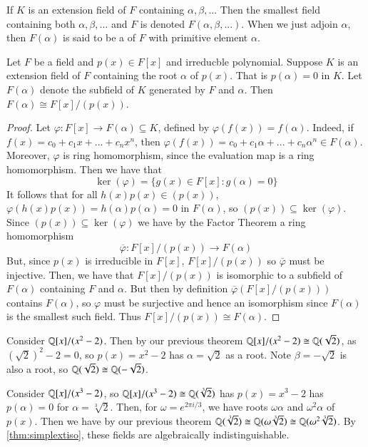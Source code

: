 \begin{definition}
    If $K$ is an extension field of $F$ containing $\alpha, \beta,...$ Then the smallest field containing both $\alpha,\beta,...$ and $F$ is denoted $F(\alpha,\beta,...)$. When we just adjoin $\alpha$, then $F(\alpha)$ is said to be a  of $F$ with primitive element $\alpha$.
\end{definition}


\begin{theorem}\label{thm:simplextiso}
    Let $F$ be a field and $p(x) \in F[x]$ and irreducble polynomial. Suppose $K$ is an extension field of $F$ containing the root $\alpha$ of $p(x)$. That is $p(\alpha) = 0$ in $K$. Let $F(\alpha)$ denote the subfield of $K$ generated by $F$ and $\alpha$. Then $F(\alpha) \cong F[x]/(p(x))$.
\end{theorem}
\begin{proof}
    Let $\varphi:F[x]\rightarrow F(\alpha) \subseteq K$, defined by $\varphi(f(x)) = f(\alpha)$. Indeed, if $f(x) = c_0+c_1x+...+c_nx^n$, then $\varphi(f(x)) = c_0+c_1\alpha+...+c_n\alpha^n \in F(\alpha)$. Moreover, $\varphi$ is ring homomorphism, since the evaluation map is a ring homomorphism. Then we have that $$\ker(\varphi) = \{g(x) \in F[x]:g(\alpha) = 0\}$$
    It follows that for all $h(x)p(x) \in (p(x))$, $\varphi(h(x)p(x)) = h(\alpha)p(\alpha) = 0$ in $F(\alpha)$, so $(p(x)) \subseteq \ker(\varphi)$. Since $(p(x)) \subseteq \ker(\varphi)$ we have by the Factor Theorem a ring homomorphism $$\overline{\varphi}:F[x]/(p(x)) \rightarrow F(\alpha)$$
    But, since $p(x)$ is irreducible in $F[x]$, $F[x]/(p(x))$ so $\overline{\varphi}$ must be injective. Then, we have that $F[x]/(p(x))$ is isomorphic to a subfield of $F(\alpha)$ containing $F$ and $\alpha$. But then by definition $\overline{\varphi}(F[x]/(p(x)))$ contains $F(\alpha)$, so $\varphi$ must be surjective and hence an isomorphism since $F(\alpha)$ is the smallest such field. Thus $F[x]/(p(x)) \cong F(\alpha)$.
\end{proof}


\begin{example}
    Consider $\mathbb Q[x]/(x^2-2)$. Then by our previous theorem $\mathbb Q[x]/(x^2-2) \cong \mathbb Q(\sqrt{2})$, as $(\sqrt{2})^2 - 2 = 0$, so $p(x) = x^2-2$ has $\alpha = \sqrt{2}$ as a root. Note $\beta = -\sqrt{2}$ is also a root, so $\mathbb Q(\sqrt{2}) \cong \mathbb Q(-\sqrt{2})$.
\end{example}

\begin{example}
    Consider $\mathbb Q[x]/(x^3-2)$, so $\mathbb Q[x]/(x^3-2) \cong \mathbb Q(\sqrt[3]{2})$ has $p(x) = x^3-2$ has $p(\alpha) = 0$ for $\alpha = \sqrt[3]{2}$. Then, for $\omega = e^{2\pi i/3}$, we have roots $\omega\alpha$ and $\omega^2\alpha$ of $p(x)$. Then we have by our previous theorem $\mathbb Q(\sqrt[3]{2}) \cong \mathbb Q(\omega\sqrt[3]{2}) \cong \mathbb Q(\omega^2\sqrt[3]{2})$. By \ref{thm:simplextiso}, these fields are algebraically indistinguishable. 
\end{example}


